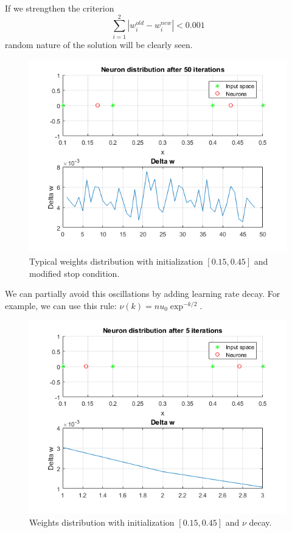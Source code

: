 \documentclass[a4paper, 12pt]{article}
\begin{document}
 \clearpage
 If we strengthen the criterion $$\sum_{i=1}^2|w_i^{old} - w_i^{new}| < 0.001$$ random nature of the solution will be clearly seen.

 \begin{figure}[h]
  \centering
  \caption{Typical weights distribution with initialization $[0.15, 0.45]$ and modified stop condition.}
  \includegraphics[scale = 0.7]{2}
\end{figure}
We can partially avoid this oscillations by adding learning rate decay. For example, we can use this rule: $\nu(k) = nu_0 \exp^{-k/2}$.
\begin{figure}[h]
  \centering
  \caption{Weights distribution with initialization $[0.15, 0.45]$ and $\nu$ decay.}
  \includegraphics[scale = 0.7]{3}
\end{figure}
\end{document}
